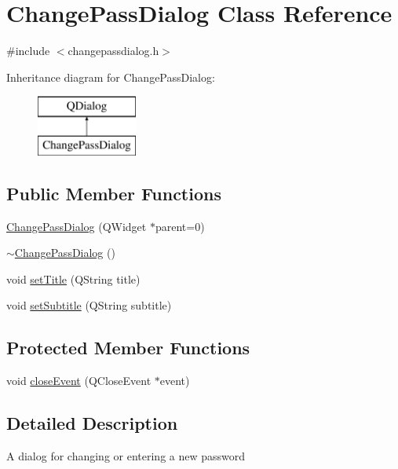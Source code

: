 \hypertarget{class_change_pass_dialog}{\section{Change\+Pass\+Dialog Class Reference}
\label{class_change_pass_dialog}
}


{\ttfamily \#include $<$changepassdialog.\+h$>$}

Inheritance diagram for Change\+Pass\+Dialog\+:\begin{figure}[H]
\begin{center}
\leavevmode
\includegraphics[height=2.000000cm]{class_change_pass_dialog}
\end{center}
\end{figure}
\subsection*{Public Member Functions}
\begin{DoxyCompactItemize}
\item 
\hyperlink{class_change_pass_dialog_ad6f0b8725148486bd3d3240366d01333}{Change\+Pass\+Dialog} (Q\+Widget $\ast$parent=0)
\item 
\hyperlink{class_change_pass_dialog_a0ec4384e68b299582b4fe8424d1b6038}{$\sim$\+Change\+Pass\+Dialog} ()
\item 
void \hyperlink{class_change_pass_dialog_a86889ca01de70686efcfe198d0e96963}{set\+Title} (Q\+String title)
\item 
void \hyperlink{class_change_pass_dialog_a6964624bf760e029877b9c7e25d50d18}{set\+Subtitle} (Q\+String subtitle)
\end{DoxyCompactItemize}
\subsection*{Protected Member Functions}
\begin{DoxyCompactItemize}
\item 
void \hyperlink{class_change_pass_dialog_ab086e0854e5e5f15b810ad09f9b18b91}{close\+Event} (Q\+Close\+Event $\ast$event)
\end{DoxyCompactItemize}


\subsection{Detailed Description}
A dialog for changing or entering a new password 

